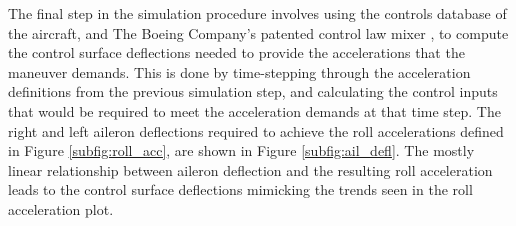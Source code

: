The final step in the simulation procedure involves using the controls database of the aircraft, and The Boeing Company's patented control law mixer \cite{control_law_patent}, to compute the control surface deflections needed to provide the accelerations that the maneuver demands.
This is done by time-stepping through the acceleration definitions from the previous simulation step, and calculating the control inputs that would be required to meet the acceleration demands at that time step. 
The right and left aileron deflections required to achieve the roll accelerations defined in Figure \ref{subfig:roll_acc}, are shown in Figure \ref{subfig:ail_defl}.
The mostly linear relationship between aileron deflection and the resulting roll acceleration leads to the control surface deflections mimicking the trends seen in the roll acceleration plot. 

